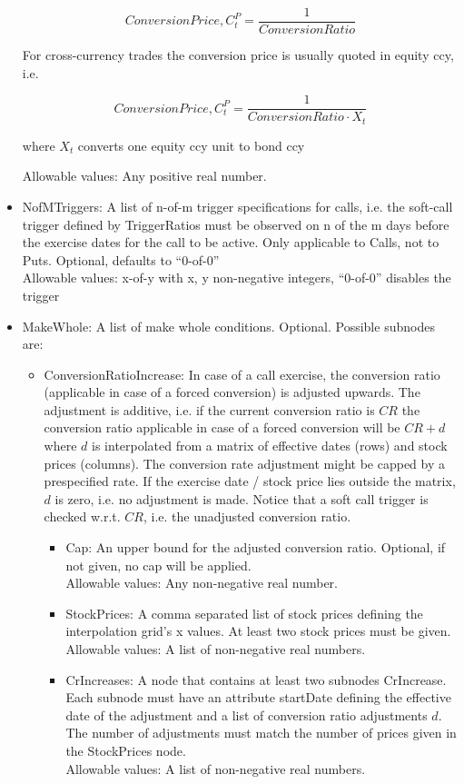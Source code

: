 \begin{itemize}
$$
Conversion Price, C^P_t = \frac{1}{ConversionRatio}
$$
  
For cross-currency trades the conversion price is usually quoted in equity ccy, i.e.  
  
$$
Conversion Price, C^P_t = \frac{1}{ConversionRatio \cdot X_t}
$$  
  
where $X_t$ converts one equity ccy unit to bond ccy  
  
  Allowable values: Any positive real number.

\item NofMTriggers: A list of n-of-m trigger specifications for calls, i.e. the soft-call trigger defined by
  TriggerRatios must be observed on n of the m days before the exercise dates for the call to be active. Only applicable
  to Calls, not to Puts. Optional, defaults to ``0-of-0'' \\
  Allowable values: x-of-y with x, y non-negative integers, ``0-of-0'' disables the trigger

\item MakeWhole: A list of make whole conditions. Optional. Possible subnodes are:
  \begin{itemize}
    \item ConversionRatioIncrease: In case of a call exercise, the conversion ratio (applicable in case of a forced
      conversion) is adjusted upwards. The adjustment is additive, i.e. if the current conversion ratio is $CR$ the
      conversion ratio applicable in case of a forced conversion will be $CR+d$ where $d$ is interpolated from a matrix
      of effective dates (rows) and stock prices (columns). The conversion rate adjustment might be capped by a
      prespecified rate. If the exercise date / stock price lies outside the matrix, $d$ is zero, i.e. no adjustment is
      made. Notice that a soft call trigger is checked w.r.t. $CR$, i.e. the unadjusted conversion ratio.
      \begin{itemize}
      \item Cap: An upper bound for the adjusted conversion ratio. Optional, if not given, no cap will be applied.\\
        Allowable values: Any non-negative real number.
      \item StockPrices: A comma separated list of stock prices defining the interpolation grid's x values. At least two
        stock prices must be given.\\
        Allowable values: A list of non-negative real numbers.
      \item CrIncreases: A node that contains at least two subnodes CrIncrease. Each subnode must have an attribute
        startDate defining the effective date of the adjustment and a list of conversion ratio adjustments $d$. The
        number of adjustments must match the number of prices given in the StockPrices node. \\
        Allowable values: A list of non-negative real numbers.
      \end{itemize}
  \end{itemize}

\end{itemize}

